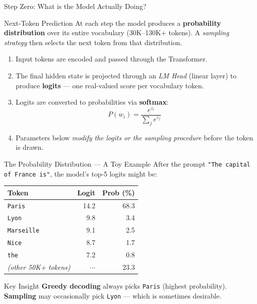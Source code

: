 \documentclass{beamer}
\begin{document}
\begin{frame}{Step Zero: What is the Model Actually Doing?}
    \begin{block}{Next-Token Prediction}
        At each step the model produces a \textbf{probability distribution} over its entire vocabulary
        (30K--130K+ tokens). A \emph{sampling strategy} then selects the next token from that distribution.
    \end{block}
    \vspace{0.3cm}
    \begin{enumerate}
        \item Input tokens are encoded and passed through the Transformer.
        \item The final hidden state is projected through an \emph{LM Head} (linear layer) to produce
              \textbf{logits} --- one real-valued score per vocabulary token.
        \item Logits are converted to probabilities via \textbf{softmax}:
              \[
                  P(w_i) = \frac{e^{z_i}}{\sum_j e^{z_j}}
              \]
        \item Parameters below \emph{modify the logits or the sampling procedure} before the token is drawn.
    \end{enumerate}
\end{frame}

\begin{frame}{The Probability Distribution --- A Toy Example}
    \centering
    \small
    After the prompt \texttt{"The capital of France is"}, the model's top-5 logits might be:

    \vspace{0.3cm}
    \begin{tabular}{@{}lrr@{}}
        \toprule
        \textbf{Token} & \textbf{Logit} & \textbf{Prob (\%)} \\ \midrule
        \texttt{Paris}     & 14.2 & 68.3 \\
        \texttt{Lyon}      &  9.8 &  3.4 \\
        \texttt{Marseille} &  9.1 &  2.5 \\
        \texttt{Nice}      &  8.7 &  1.7 \\
        \texttt{the}       &  7.2 &  0.8 \\
        \textit{(other 50K+ tokens)} & $\cdots$ & 23.3 \\ \bottomrule
    \end{tabular}

    \vspace{0.4cm}
    \begin{alertblock}{Key Insight}
        \textbf{Greedy decoding} always picks \texttt{Paris} (highest probability).
        \textbf{Sampling} may occasionally pick \texttt{Lyon} --- which is sometimes desirable.
    \end{alertblock}
\end{frame}
\end{document}
